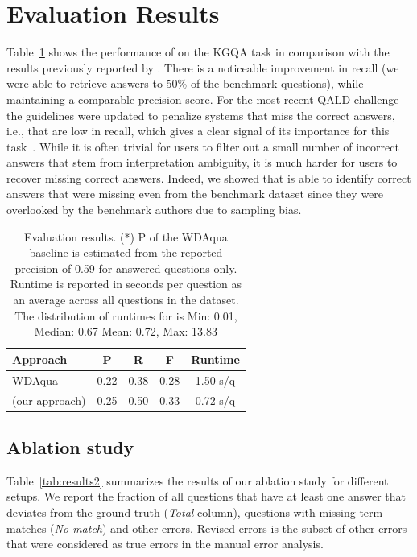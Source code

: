 \section{Evaluation Results}
\label{sec:results}

Table~\ref{tab:results1} shows the performance of \OurApproach{} on the KGQA task in comparison with the results previously reported by  \citet{DBLP:journals/corr/abs-1803-00832}.
There is a noticeable improvement in recall (we were able to retrieve answers to 50\% of the benchmark questions), while maintaining a comparable precision score.
For the most recent QALD challenge the guidelines were updated to penalize systems that miss the correct answers, i.e., that are low in recall, which gives a clear signal of its importance for this task~\cite{DBLP:conf/semweb/UsbeckGN018}.
While it is often trivial for users to filter out a small number of incorrect answers that stem from interpretation ambiguity, it is much harder for users to recover missing correct answers.
Indeed, we showed that \OurApproach{} is able to identify correct answers that were missing even from the benchmark dataset since they were overlooked by the benchmark authors due to sampling bias.

\begin{table}
\centering
\caption{Evaluation results. (*) P of the WDAqua baseline is estimated from the reported precision of 0.59 for answered questions only. Runtime is reported in seconds per question as an average across all questions in the dataset. The distribution of runtimes for \OurApproach{} is Min: 0.01, Median: 0.67 Mean: 0.72, Max: 13.83}
\label{tab:results1}
\begin{tabular}{lcccc}
\toprule
\bf Approach & \bf P & \bf R & \bf F & \bf Runtime \\
\midrule
WDAqua & 0.22\smash{\rlap{*}} & 0.38 & 0.28    & 1.50 s/q \\
\OurApproach{} (our approach)      & 0.25 & 0.50 & 0.33    &   0.72 s/q  \\
\bottomrule
\end{tabular}
\end{table}

\subsection{Ablation study} 
Table~\ref{tab:results2} summarizes the results of our ablation study for different setups.
We report the fraction of all questions that have at least one answer that deviates from the ground truth (\emph{Total} column), questions with missing term matches (\emph{No match}) and other errors. 
Revised errors is the subset of other errors that were considered as true errors in the manual error analysis.

